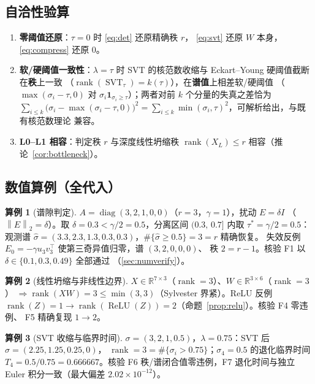\documentclass[UTF8,11pt,a4paper]{ctexart}
\theoremstyle{plain}
\theoremstyle{definition}
\newtheorem{example}{算例}
\theoremstyle{remark}
\newcommand{\R}{\mathbb{R}}
\newcommand{\rank}{\operatorname{rank}}
\newcommand{\diag}{\operatorname{diag}}
\newcommand{\ReLU}{\operatorname{ReLU}}
\newcommand{\SVT}{\operatorname{SVT}}
\newcommand{\Tnorm}[1]{\left\lVert #1\right\rVert_2}
\begin{document}
\subsection{自洽性验算}

\begin{enumerate}
\item \textbf{零阈值还原}：$\tau=0$ 时 \eqref{eq:det} 还原精确秩 $r$，
  \eqref{eq:svt} 还原 $W$ 本身，\eqref{eq:compress} 还原 $0$。
\item \textbf{软/硬阈值一致性}：$\lambda=\tau$ 时 SVT 的核范数收缩与
  Eckart--Young 硬阈值截断在\textbf{秩}上一致
  （$\rank(\SVT_\tau)=k(\tau)$），在\textbf{谱值}上相差软/硬阈值
  （$\max(\sigma_i-\tau,0)$ 对 $\sigma_i\mathbf 1_{\sigma_i\ge\tau}$）；两者对前
  $k$ 个分量的失真之差恰为
  $\sum_{i\le k}\big(\sigma_i-\max(\sigma_i-\tau,0)\big)^2
  =\sum_{i\le k}\min(\sigma_i,\tau)^2$，可解析给出，与既有核范数理论
  \cite{fazel2002,recht2010}兼容。
\item \textbf{L0--L1 相容}：判定秩 $r$ 与深度线性坍缩秩
  $\rank(X_L)\le r$ 相容（推论~\ref{cor:bottleneck}）。
\end{enumerate}

\subsection{数值算例（全代入）}

\begin{example}[谱隙判定]\label{ex:gap}
$A=\diag(3,2,1,0,0)$（$r=3$，$\gamma=1$），扰动 $E=\delta I$
（$\Tnorm{E}=\delta$）。取 $\delta=0.3<\gamma/2=0.5$，分离区间
$(0.3,\,0.7]$ 内取 $\tau^*=\gamma/2=0.5$：观测谱
$\hat\sigma=(3.3,2.3,1.3,0.3,0.3)$，$\#\{\hat\sigma\ge0.5\}=3=r$ 精确恢复。
失效反例 $E_0=-\gamma u_3v_3^\top$ 使第三奇异值归零，谱 $(3,2,0,0,0)$、
秩 $2=r-1$。核验 F1 以 $\delta\in\{0.1,0.3,0.49\}$ 全部通过
（\textsection\ref{sec:numverify}）。
\end{example}

\begin{example}[线性坍缩与非线性边界]\label{ex:linear}
$X\in\R^{7\times3}$（$\rank=3$）、$W\in\R^{3\times6}$（$\rank=3$）
$\Rightarrow\rank(XW)=3\le\min(3,3)$（Sylvester 界紧）。ReLU 反例
$\rank(Z)=1\to\rank(\ReLU(Z))=2$（命题~\ref{prop:relu}）。核验 F4 零违例、
F5 精确复现 $1\to2$。
\end{example}

\begin{example}[SVT 收缩与临界时间]\label{ex:svt}
$\sigma=(3,2,1,0.5)$，$\lambda=0.75$：SVT 后
$\hat\sigma=(2.25,1.25,0.25,0)$，
$\rank=3=\#\{\sigma_i>0.75\}$；$\sigma_4=0.5$ 的退化临界时间
$T_4=0.5/0.75=0.666667$。核验 F6 秩/谱闭合值零违例，F7 退化时间与独立
Euler 积分一致（最大偏差 $2.02\times10^{-12}$）。
\end{example}
\end{document}
